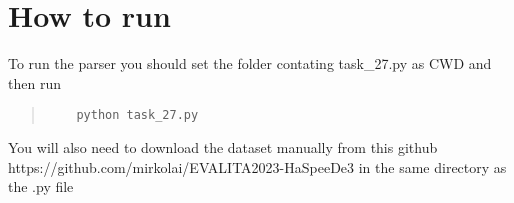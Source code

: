 \documentclass[11pt]{article}
\begin{document}
\section{How to run}
To run the parser you should set the folder contating task\_27.py as CWD and then run
\begin{quote}
  \begin{verbatim}
    python task_27.py
  \end{verbatim}
\end{quote}
\noindent You will also need to download the dataset manually from this github https://github.com/mirkolai/EVALITA2023-HaSpeeDe3
in the same directory as the .py file
\newpage
\end{document}
